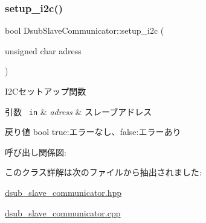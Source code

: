 \subsubsection{\texorpdfstring{setup\_i2c()}{setup\_i2c()}}
{\footnotesize\ttfamily bool Dsub\+Slave\+Communicator\+::setup\+\_\+i2c (\begin{DoxyParamCaption}\item[{unsigned char}]{adress }\end{DoxyParamCaption})}



I2\+Cセットアップ関数 


\begin{DoxyParams}[1]{引数}
\mbox{\texttt{ in}}  & {\em adress} & スレーブアドレス \\
\hline
\end{DoxyParams}
\begin{DoxyReturn}{戻り値}
bool true\+:エラーなし、false\+:エラーあり 
\end{DoxyReturn}
呼び出し関係図\+:


このクラス詳解は次のファイルから抽出されました\+:\begin{DoxyCompactItemize}
\item 
\mbox{\hyperlink{dsub__slave__communicator_8hpp}{dsub\+\_\+slave\+\_\+communicator.\+hpp}}\item 
\mbox{\hyperlink{dsub__slave__communicator_8cpp}{dsub\+\_\+slave\+\_\+communicator.\+cpp}}\end{DoxyCompactItemize}
